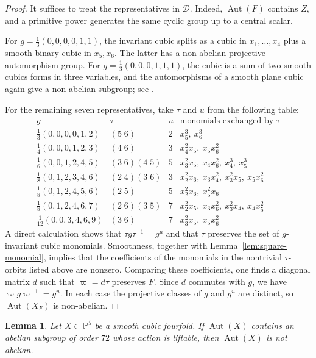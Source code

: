 \documentclass[12pt]{amsart}
\numberwithin{equation}{section}
\theoremstyle{plain}
\newtheorem{lem}[thm]{Lemma}
\theoremstyle{definition}
\theoremstyle{remark}
\newcommand{\PP}{\mathbb P}
\DeclareMathOperator{\Aut}{Aut}
\begin{document}
\begin{proof}
It suffices to treat the representatives in $\mathscr D$.  Indeed,
$\Aut(F)$ contains $Z$, and a primitive power generates the same cyclic
group up to a central scalar.

For $g=\frac13(0,0,0,0,1,1)$, the invariant cubic splits as a cubic in
$x_1,\ldots,x_4$ plus a smooth binary cubic in $x_5,x_6$.  The latter has
a non-abelian projective automorphism group.  For
$g=\frac13(0,0,0,1,1,1)$, the cubic is a sum of two smooth cubics forms in three variables,
and the automorphisms of a smooth plane cubic again give a non-abelian
subgroup; see \cite[Lemma~3.12]{yang2024automorphism}.

For the remaining seven representatives, take $\tau$ and $u$ from the
following table:
$$
\begin{array}{c|c|c|c}
g&\tau&u&\text{monomials exchanged by }\tau\\ \hline
\frac13(0,0,0,0,1,2)&(5\;6)&2&
x_5^3,\ x_6^3\\
\frac14(0,0,0,1,2,3)&(4\;6)&3&
x_4^2x_5,\ x_5x_6^2\\
\frac16(0,0,1,2,4,5)&(3\;6)(4\;5)&5&
x_3^2x_5,\ x_4x_6^2,\ x_4^3,\ x_5^3\\
\frac18(0,1,2,3,4,6)&(2\;4)(3\;6)&3&
x_2^2x_6,\ x_3x_4^2,\ x_3^2x_5,\ x_5x_6^2\\
\frac18(0,1,2,4,5,6)&(2\;5)&5&
x_2^2x_6,\ x_5^2x_6\\
\frac18(0,1,2,4,6,7)&(2\;6)(3\;5)&7&
x_2^2x_5,\ x_3x_6^2,\ x_3^2x_4,\ x_4x_5^2\\
\frac1{12}(0,0,3,4,6,9)&(3\;6)&7&
x_3^2x_5,\ x_5x_6^2
\end{array}
$$
A direct calculation shows that $\tau g\tau^{-1}=g^u$ and that $\tau$
preserves the set of $g$-invariant cubic monomials.  Smoothness, together
with Lemma~\ref{lem:square-monomial}, implies that the coefficients of the monomials in the nontrivial $\tau$-orbits listed above are nonzero.  Comparing these
coefficients, one finds a diagonal matrix $d$ such that
$\varpi=d\tau$ preserves $F$.  Since $d$ commutes with $g$, we have
$\varpi g\varpi^{-1}=g^u$.  In each case the projective classes of $g$ and
$g^u$ are distinct, so $\Aut(X_F)$ is non-abelian.
\end{proof}

\begin{lem}\label{lem:order-72-nonabelian}
Let $X\subset\PP^5$ be a smooth cubic fourfold.  If $\Aut(X)$ contains an
abelian subgroup of order $72$ whose action is liftable, then $\Aut(X)$ is
not abelian.
\end{lem}
\end{document}
